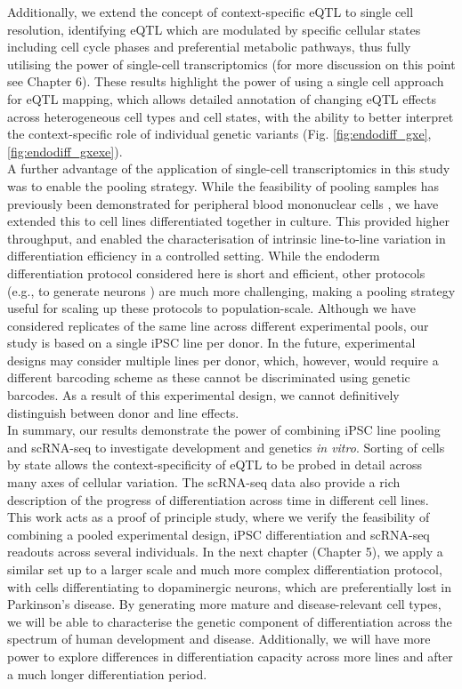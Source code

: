 Additionally, we extend the concept of context-specific eQTL \cite{fairfax2012genetics, fairfax2014innate, knowles2017allele} to single cell resolution, identifying eQTL which are modulated by specific cellular states including cell cycle phases and preferential metabolic pathways, thus fully utilising the power of single-cell transcriptomics (for more discussion on this point see Chapter 6).
These results highlight the power of using a single cell approach for eQTL mapping, which allows detailed annotation of changing eQTL effects across heterogeneous cell types and cell states, with the ability to better interpret the context-specific role of individual genetic variants (Fig. \ref{fig:endodiff_gxe}, \ref{fig:endodiff_gxexe}). \\

A further advantage of the application of single-cell transcriptomics in this study was to enable the pooling strategy. 
While the feasibility of pooling samples has previously been demonstrated for peripheral blood mononuclear cells \cite{kang2018multiplexed}, we have extended this to cell lines differentiated together in culture. 
This provided higher throughput, and enabled the characterisation of intrinsic line-to-line variation in differentiation efficiency in a controlled setting. 
While the endoderm differentiation protocol considered here is short and efficient, other protocols (e.g., to generate neurons \cite{tao2016neural}) are much more challenging, making a pooling strategy useful for scaling up these protocols to population-scale.
Although we have considered replicates of the same line across different experimental pools, our study is based on a single iPSC line per donor. 
In the future, experimental designs may consider multiple lines per donor, which, however, would require a different barcoding scheme as these cannot be discriminated
using genetic barcodes. 
As a result of this experimental design, we cannot definitively distinguish between donor and line effects.\\

In summary, our results demonstrate the power of combining iPSC line pooling and scRNA-seq to investigate development and genetics \textit{in vitro}. 
Sorting of cells by state allows the context-specificity of eQTL to be probed in detail across many axes of cellular variation. 
The scRNA-seq data also provide a rich description of the progress of differentiation across time in different cell lines. \\

This work acts as a proof of principle study, where we verify the feasibility of combining a pooled experimental design, iPSC differentiation and scRNA-seq readouts across several individuals.
In the next chapter (Chapter 5), we apply a similar set up to a larger scale and much more complex differentiation protocol, with cells differentiating to dopaminergic neurons, which are preferentially lost in Parkinson's disease.
By generating more mature and disease-relevant cell types, we will be able to characterise the genetic component of differentiation across the spectrum of human development and disease.
Additionally, we will have more power to explore differences in differentiation capacity across more lines and after a much longer differentiation period.

